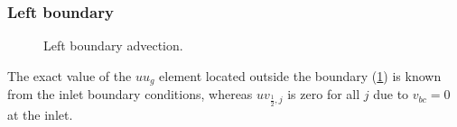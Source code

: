 \documentclass{article}
\numberwithin{equation}{section}
\begin{document}
\subsubsection{Left boundary}\label{subsubsec:advection-left}
\begin{figure}[H] %
  \caption{Left boundary advection.}\label{fig:ADV-left}
\end{figure}
The exact value of the $uu_g$ element located outside the boundary (\cref{fig:ADV-left}) is known from the inlet boundary conditions, whereas $uv_{\frac{1}{2},j}$ is zero for all $j$ due to $v_{bc}=0$ at the inlet. 
\end{document}
